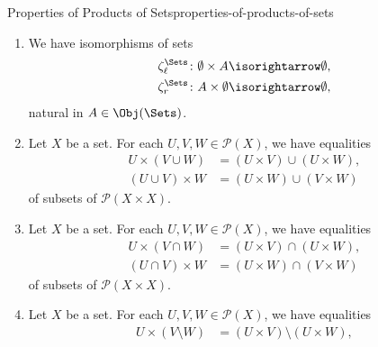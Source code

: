 \begin{proposition}{Properties of Products of Sets}{properties-of-products-of-sets}
\begin{enumerate}
            \begin{align*}
                \delta^{\Sets}_{\ell} &\colon A\times(B\icoprod C)  \isorightarrow (A\times B)\icoprod(A\times C),\\
                \delta^{\Sets}_{r}    &\colon (A\icoprod B)\times C \isorightarrow (A\times C)\icoprod(B\times C),
            \end{align*}
            natural in $A,B,C\in\Obj(\Sets)$.
        \item\label{properties-of-products-of-sets-annihilation-with-the-empty-set}We have isomorphisms of sets
            \begin{align*}
                \zeta^{\Sets}_{\ell} &\colon \emptyset\times A \isorightarrow \emptyset,\\
                \zeta^{\Sets}_{r}    &\colon A\times\emptyset  \isorightarrow \emptyset,
            \end{align*}
            natural in $A\in\Obj(\Sets)$.
        \item\label{properties-of-products-of-sets-distributivity-over-unions}Let $X$ be a set. For each $U,V,W\in\mathcal{P}(X)$, we have equalities
            \begin{align*}
                U\times(V\cup W)  &= (U\times V)\cup(U\times W),\\%
                (U\cup V)\times W &= (U\times W)\cup(V\times W)
            \end{align*}
            of subsets of $\mathcal{P}(X\times X)$.
        \item\label{properties-of-products-of-sets-distributivity-over-intersections}Let $X$ be a set. For each $U,V,W\in\mathcal{P}(X)$, we have equalities
            \begin{align*}
                U\times(V\cap W)  &= (U\times V)\cap(U\times W),\\%
                (U\cap V)\times W &= (U\times W)\cap(V\times W)
            \end{align*}
            of subsets of $\mathcal{P}(X\times X)$.
        \item\label{properties-of-products-of-sets-distributivity-over-differences}Let $X$ be a set. For each $U,V,W\in\mathcal{P}(X)$, we have equalities
            \begin{align*}
                U\times(V\setminus W)  &= (U\times V)\setminus(U\times W),\\%

\end{align*}
\end{enumerate}
\end{proposition}
